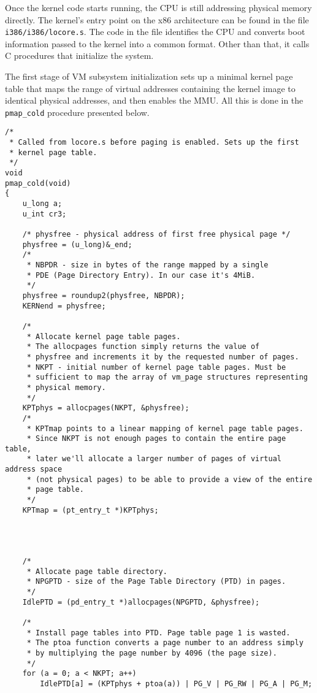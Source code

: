\documentclass[shortabstract, english]{iithesis}
\newenvironment{code}{}{}
\begin{document}
Once the kernel code starts running, the CPU is still addressing physical memory
directly. The kernel's entry point on the x86 architecture can be found in the
file \texttt{i386/i386/locore.s}. The code in the file identifies the CPU and
converts boot information passed to the kernel into a common format. Other than
that, it calls C procedures that initialize the system.

The first stage of VM subsystem initialization sets up a minimal kernel page
table that maps the range of virtual addresses containing the kernel image to
identical physical addresses, and then enables the MMU. All this is done in the
\texttt{pmap_cold} procedure presented below.

\begin{code}
\begin{verbatim}
/*
 * Called from locore.s before paging is enabled. Sets up the first
 * kernel page table.
 */
void
pmap_cold(void)
{
    u_long a;
    u_int cr3;

    /* physfree - physical address of first free physical page */
    physfree = (u_long)&_end;
    /*
     * NBPDR - size in bytes of the range mapped by a single
     * PDE (Page Directory Entry). In our case it's 4MiB.
     */
    physfree = roundup2(physfree, NBPDR);
    KERNend = physfree;

    /*
     * Allocate kernel page table pages.
     * The allocpages function simply returns the value of
     * physfree and increments it by the requested number of pages.
     * NKPT - initial number of kernel page table pages. Must be
     * sufficient to map the array of vm_page structures representing
     * physical memory.
     */
    KPTphys = allocpages(NKPT, &physfree);
    /*
     * KPTmap points to a linear mapping of kernel page table pages.
     * Since NKPT is not enough pages to contain the entire page table,
     * later we'll allocate a larger number of pages of virtual address space
     * (not physical pages) to be able to provide a view of the entire
     * page table.
     */
    KPTmap = (pt_entry_t *)KPTphys;




    /*
     * Allocate page table directory.
     * NPGPTD - size of the Page Table Directory (PTD) in pages.
     */
    IdlePTD = (pd_entry_t *)allocpages(NPGPTD, &physfree);

    /*
     * Install page tables into PTD. Page table page 1 is wasted.
     * The ptoa function converts a page number to an address simply
     * by multiplying the page number by 4096 (the page size).
     */
    for (a = 0; a < NKPT; a++)
        IdlePTD[a] = (KPTphys + ptoa(a)) | PG_V | PG_RW | PG_A | PG_M;


\end{verbatim}
\end{code}
\end{document}
